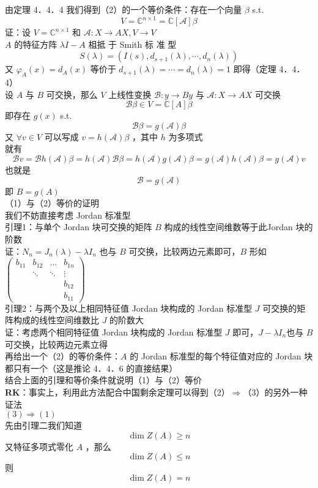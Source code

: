 \documentclass[UTF8]{ctexart}
\begin{document}
\noindent 由定理 4．4．4 我们得到（2）的一个等价条件：存在一个向量 $\beta$ s.t.
$$V=\mathbb{C}^{n \times 1}=\mathbb{C}[\mathcal{A}] \beta$$
证：设 $V=\mathbb{C}^{n \times 1}$ 和 $\mathcal{A}: X \rightarrow A X, V \rightarrow V$\\
$A$ 的特征方阵 $\lambda I-A$ 柤抵 于 Smith 标 准 型 
$$S(\lambda)=\left(I(s), d_{s+1}(\lambda), \cdots, d_{n}(\lambda)\right)$$
又 $\varphi_{A}(x)=d_{A}(x)$ 等价于 $d_{s+1}(\lambda)=\cdots=d_{n}(\lambda)=1$ 即得（定理 4．4．4）\\


\noindent 设 $A$ 与 $B$ 可交换，那么 $V$ 上线性变换 $\mathcal{B}: y \rightarrow B y$ 与 $\mathcal{A}: X \rightarrow A X$ 可交换\\
$$\mathcal{B} \beta \in V=\mathbb{C}[A] \beta$$
 即存在 $g(x)$ s.t. $$\mathcal{B} \beta=g(\mathcal{A}) \beta$$
又 $\forall v \in V$ 可以写成 $v=h(\mathcal{A}) \beta$ ，其中 $h$ 为多项式\\
就有 
$$\mathcal{B} v=\mathcal{B} h(\mathcal{A}) \beta=h(\mathcal{A}) \mathcal{B} \beta=h(\mathcal{A}) g(\mathcal{A}) \beta=g(\mathcal{A}) h(\mathcal{A}) \beta=g(\mathcal{A}) v$$
也就是 
$$\mathcal{B}=g(\mathcal{A})$$
即 $B=g(A)$\\
（1）与（2）等价的证明\\
我们不妨直接考虑 Jordan 标准型\\
引理1：与单个 Jordan 块可交换的矩阵 $B$ 构成的线性空间维数等于此Jordan 块的阶数\\
证：$N_{n}=J_{n}(\lambda)-\lambda I_{n}$ 也与 $B$ 可交换，比较两边元素即可，$B$ 形如 $\left(\begin{array}{cccc}b_{11} & b_{12} & \ldots & b_{1 n} \\ & \ddots & \ddots & \vdots \\ & & & b_{12} \\ & & & b_{11}\end{array}\right)$\\
引理2：与两个及以上相同特征值 Jordan 块构成的 Jordan 标准型 $J$ 可交换的矩阵构成的线性空间维数比 $J$ 的阶数大\\
证：考虑两个相同特征值 Jordan 块构成的 Jordan 标准型 $J$ 即可，$J-\lambda I_{n}$也与 $B$ 可交换，比较两边元素立得\\
再给出一个（2）的等价条件：$A$ 的 Jordan 标准型的每个特征值对应的 Jordan 块都只有一个（这是推论 4．4．6 的直接结果）\\
结合上面的引理和等价条件就说明（1）与（2）等价\\
\textbf{RK}：事实上，利用此方法配合中国剩余定理可以得到（2）$\Rightarrow$（3）的另外一种证法\\
$(3) \Rightarrow(1)$\\
先由引理二我们知道 
$$\operatorname{dim} Z(A) \geq n$$
又特征多项式零化 $A$ ，那么
$$\operatorname{dim} Z(A) \leq n$$
则 
$$\operatorname{dim} Z(A)=n$$\\
\end{document}
